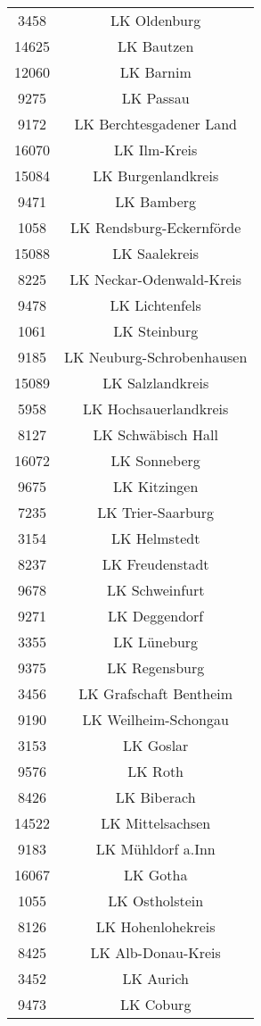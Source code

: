 \begin{tabular}{c c}
    3458&LK Oldenburg\\ 
    14625&LK Bautzen\\ 
    12060&LK Barnim\\ 
    9275&LK Passau\\ 
    9172&LK Berchtesgadener Land\\ 
    16070&LK Ilm-Kreis\\ 
    15084&LK Burgenlandkreis\\ 
    9471&LK Bamberg\\ 
    1058&LK Rendsburg-Eckernförde\\ 
    15088&LK Saalekreis\\ 
    8225&LK Neckar-Odenwald-Kreis\\ 
    9478&LK Lichtenfels\\ 
    1061&LK Steinburg\\ 
    9185&LK Neuburg-Schrobenhausen\\ 
    15089&LK Salzlandkreis\\ 
    5958&LK Hochsauerlandkreis\\ 
    8127&LK Schwäbisch Hall\\ 
    16072&LK Sonneberg\\ 
    9675&LK Kitzingen\\ 
    7235&LK Trier-Saarburg\\ 
    3154&LK Helmstedt\\ 
    8237&LK Freudenstadt\\ 
    9678&LK Schweinfurt\\ 
    9271&LK Deggendorf\\ 
    3355&LK Lüneburg\\ 
    9375&LK Regensburg\\ 
    3456&LK Grafschaft Bentheim\\ 
    9190&LK Weilheim-Schongau\\ 
    3153&LK Goslar\\ 
    9576&LK Roth\\ 
    8426&LK Biberach\\ 
    14522&LK Mittelsachsen\\ 
    9183&LK Mühldorf a.Inn\\ 
    16067&LK Gotha\\ 
    1055&LK Ostholstein\\ 
    8126&LK Hohenlohekreis\\ 
    8425&LK Alb-Donau-Kreis\\ 
    3452&LK Aurich\\ 
    9473&LK Coburg\\ 

\end{tabular}
